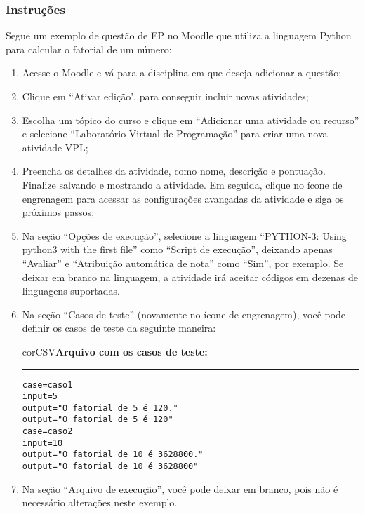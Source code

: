 \subsubsection{Instruções}

Segue um exemplo de questão de EP no Moodle que utiliza a linguagem Python para calcular o fatorial de um número:

\begin{enumerate}
    \item Acesse o Moodle e vá para a disciplina em que deseja adicionar a questão;
  
    \item Clique em ``Ativar edição', para conseguir incluir novas atividades;
  
    \item Escolha um tópico do curso e clique em ``Adicionar uma atividade ou recurso'' e selecione ``Laboratório Virtual de Programação''  para criar uma nova atividade VPL;

    \item Preencha os detalhes da atividade, como nome, descrição e pontuação. Finalize salvando e mostrando a atividade. Em seguida, clique no ícone de engrenagem para acessar as configurações avançadas da atividade e siga os próximos passos;

    \item Na seção ``Opções de execução'', selecione a linguagem ``PYTHON-3: Using python3 with the first file'' como ``Script de execução'', deixando apenas ``Avaliar'' e ``Atribuição automática de nota'' como ``Sim'', por exemplo. Se deixar em branco na linguagem, a atividade irá aceitar códigos em dezenas de linguagens suportadas.

    \item Na seção ``Casos de teste'' (novamente no ícone de engrenagem), você pode definir os casos de teste da seguinte maneira:

\begin{myboxCode}{corCSV}{\textbf{Arquivo com os casos de teste:}}\vspace{3mm}
\hrule
\begin{verbatim}
case=caso1
input=5
output="O fatorial de 5 é 120."
output="O fatorial de 5 é 120"
case=caso2
input=10
output="O fatorial de 10 é 3628800."
output="O fatorial de 10 é 3628800"
\end{verbatim}
\end{myboxCode}

    \item Na seção ``Arquivo de execução'', você pode deixar em branco, pois não é necessário alterações neste exemplo.

\end{enumerate}

